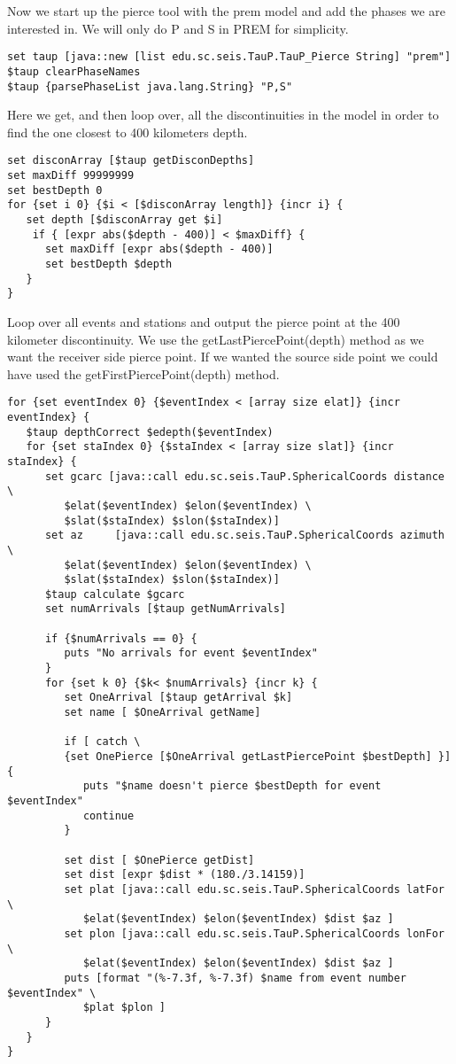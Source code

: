 Now we start up the pierce tool with the prem model
 and add the phases we are interested in. We will
only do P and S in PREM for simplicity.
\begin{verbatim}
set taup [java::new [list edu.sc.seis.TauP.TauP_Pierce String] "prem"]
$taup clearPhaseNames
$taup {parsePhaseList java.lang.String} "P,S"
\end{verbatim}

Here we get, and then loop over, all the discontinuities in the model in order
to find the one closest to 400 kilometers depth.
\begin{verbatim}
set disconArray [$taup getDisconDepths]
set maxDiff 99999999
set bestDepth 0
for {set i 0} {$i < [$disconArray length]} {incr i} {
   set depth [$disconArray get $i]
	if { [expr abs($depth - 400)] < $maxDiff} {
      set maxDiff [expr abs($depth - 400)]
      set bestDepth $depth
   }
}
\end{verbatim}

Loop over all events and stations and output the pierce point at the 400
kilometer discontinuity. We use the getLastPiercePoint(depth) method as
we want the receiver side pierce point. If we wanted the source side point
we could have used the getFirstPiercePoint(depth) method.
\begin{verbatim}
for {set eventIndex 0} {$eventIndex < [array size elat]} {incr eventIndex} {
   $taup depthCorrect $edepth($eventIndex)
   for {set staIndex 0} {$staIndex < [array size slat]} {incr staIndex} {
      set gcarc [java::call edu.sc.seis.TauP.SphericalCoords distance \
         $elat($eventIndex) $elon($eventIndex) \
         $slat($staIndex) $slon($staIndex)]
      set az     [java::call edu.sc.seis.TauP.SphericalCoords azimuth \
         $elat($eventIndex) $elon($eventIndex) \
         $slat($staIndex) $slon($staIndex)]
      $taup calculate $gcarc
      set numArrivals [$taup getNumArrivals]

      if {$numArrivals == 0} {
         puts "No arrivals for event $eventIndex"
      }
      for {set k 0} {$k< $numArrivals} {incr k} {
         set OneArrival [$taup getArrival $k]
         set name [ $OneArrival getName]

         if [ catch \
         {set OnePierce [$OneArrival getLastPiercePoint $bestDepth] }] {
            puts "$name doesn't pierce $bestDepth for event $eventIndex"
            continue
         }

         set dist [ $OnePierce getDist]
         set dist [expr $dist * (180./3.14159)]
         set plat [java::call edu.sc.seis.TauP.SphericalCoords latFor \
            $elat($eventIndex) $elon($eventIndex) $dist $az ]
         set plon [java::call edu.sc.seis.TauP.SphericalCoords lonFor \
            $elat($eventIndex) $elon($eventIndex) $dist $az ]
         puts [format "(%-7.3f, %-7.3f) $name from event number $eventIndex" \
            $plat $plon ]
      }
   }
}
\end{verbatim}

